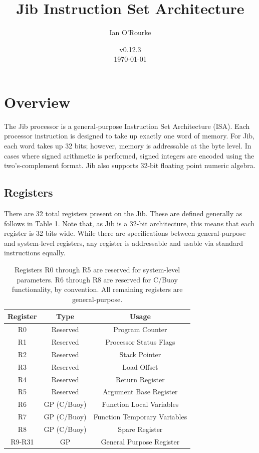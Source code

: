 \documentclass{article}
\title{Jib Instruction Set Architecture}
\author{Ian O'Rourke}
\date{v0.12.3 \\ \titlelogoimage \today}
\begin{document}
\maketitle

\section{Overview}

The Jib processor is a general-purpose Instruction Set Architecture (ISA). Each processor instruction is designed to take up exactly one word of memory. For Jib, each word takes up 32 bits; however, memory is addressable at the byte level. In cases where signed arithmetic is performed, signed integers are encoded using the two's-complement format. Jib also supports 32-bit floating point numeric algebra.

\subsection{Registers}
\label{sec:registers}

There are 32 total registers present on the Jib. These are defined generally as follows in Table \ref{table:register-setup}. Note that, as Jib is a 32-bit architecture, this means that each register is 32 bits wide. While there are specifications between general-purpose and system-level registers, any register is addressable and usable via standard instructions equally.

\begin{table}[h!]
    \centering
    \begin{tabular}{c|cc}
        \hline
        Register & Type & Usage \\
        \hline
        R0 & Reserved & Program Counter \\
        R1 & Reserved & Processor Status Flags \\
        R2 & Reserved& Stack Pointer \\
        R3 & Reserved & Load Offset \\
        R4 & Reserved & Return Register \\
        R5 & Reserved & Argument Base Register \\
        \hline
        R6 & GP (C/Buoy) & Function Local Variables \\
        R7 & GP (C/Buoy) & Function Temporary Variables \\
        R8 & GP (C/Buoy) & Spare Register \\
        \hline
        R9-R31 & GP & General Purpose Register \\
        \hline
    \end{tabular}
    \caption{Registers R0 through R5 are reserved for system-level parameters. R6 through R8 are reserved for C/Buoy functionality, by convention. All remaining registers are general-purpose.}
    \label{table:register-setup}
\end{table}
\end{document}

